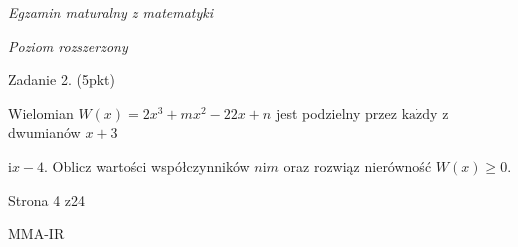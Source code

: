 \documentclass[a4paper,12pt]{article}
\begin{document}
{\it Egzamin maturalny z matematyki}

{\it Poziom rozszerzony}

Zadanie 2. (5pkt)

Wielomian $W(x)=2x^{3}+mx^{2}-22x+n$ jest podzielny przez $\mathrm{k}\mathrm{a}\dot{\mathrm{z}}\mathrm{d}\mathrm{y}$ z dwumianów $x+3$

$\mathrm{i}x-4$. Oblicz wartości współczynników $n\mathrm{i}m$ oraz rozwiąz nierówność $W(x)\geq 0.$

Strona 4 z24

MMA-IR
\end{document}
